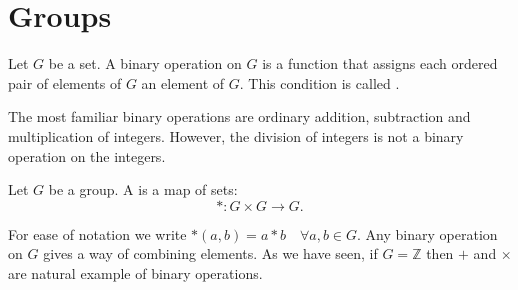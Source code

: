 \chapter{Groups}

\begin{definition}[Closure]
    Let $G$ be a set. A binary operation on $G$ is a function that assigns each ordered pair of elements of $G$ an element of $G$.
    This condition is called .
\end{definition}

The most familiar binary operations are ordinary addition, subtraction and 
multiplication of integers. However, the division of integers is not a binary operation
on the integers. 

\begin{definition}
    Let $G$ be a group. A  is a map of sets:
    \[
        * : G \times G \to G.
    \]
\end{definition}
For ease of notation we write $*(a,b) = a * b \quad \forall a,b \in G$. Any binary operation on $G$ gives a way of 
combining elements. As we have seen, if $G =\mathbb{Z}$ then $+$ and $\times$ are natural example of binary operations. 

